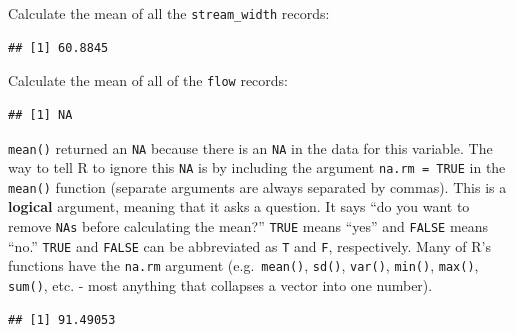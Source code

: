\documentclass[]{book}
\newenvironment{Shaded}{\begin{snugshade}}{\end{snugshade}}
\newcommand{\DataTypeTok}[1]{\textcolor[rgb]{0.13,0.29,0.53}{#1}}
\newcommand{\KeywordTok}[1]{\textcolor[rgb]{0.13,0.29,0.53}{\textbf{#1}}}
\newcommand{\NormalTok}[1]{#1}
\newcommand{\OperatorTok}[1]{\textcolor[rgb]{0.81,0.36,0.00}{\textbf{#1}}}
\begin{document}
Calculate the mean of all the \texttt{stream\_width} records:

\begin{Shaded}
\end{Shaded}

\begin{verbatim}
## [1] 60.8845
\end{verbatim}

Calculate the mean of all of the \texttt{flow} records:

\begin{Shaded}
\end{Shaded}

\begin{verbatim}
## [1] NA
\end{verbatim}

\texttt{mean()} returned an \texttt{NA} because there is an \texttt{NA} in the data for this variable. The way to tell R to ignore this \texttt{NA} is by including the argument \texttt{na.rm\ =\ TRUE} in the \texttt{mean()} function (separate arguments are always separated by commas). This is a \textbf{logical} argument, meaning that it asks a question. It says ``do you want to remove \texttt{NAs} before calculating the mean?'' \texttt{TRUE} means ``yes'' and \texttt{FALSE} means ``no.'' \texttt{TRUE} and \texttt{FALSE} can be abbreviated as \texttt{T} and \texttt{F}, respectively. Many of R's functions have the \texttt{na.rm} argument (e.g.~\texttt{mean()}, \texttt{sd()}, \texttt{var()}, \texttt{min()}, \texttt{max()}, \texttt{sum()}, etc. - most anything that collapses a vector into one number).

\begin{Shaded}
\end{Shaded}

\begin{verbatim}
## [1] 91.49053
\end{verbatim}
\end{document}
